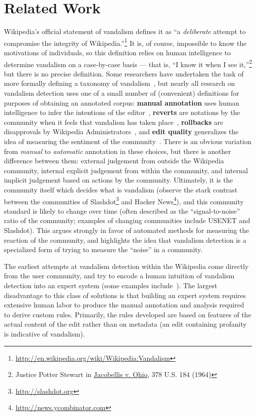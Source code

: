 \section{Related Work}
\label{sec:vandalism-related}

Wikipedia's official statement of vandalism defines it as
``a \textit{deliberate} attempt to compromise the integrity
of Wikipedia.''\footnote{
\url{http://en.wikipedia.org/wiki/Wikipedia:Vandalism}}
It is, of course, impossible to know the motivations of individuals,
so this definition relies on human intelligence to determine
vandalism on a case-by-case basis --- that is, ``I know it
when I see it,''\footnote{Justice Potter Stewart in
\underline{Jacobellis v. Ohio}, 378 U.S. 184 (1964)}
but there is no precise definition.
Some researchers have undertaken the task of more formally defining a
taxonomy of vandalism~\cite{Viegas2004,Priedhorsky2007,Chin2010},
but nearly all research on vandalism detection uses one of a small
number of (convenient) definitions for purposes of obtaining an
annotated corpus: \textbf{manual annotation} uses human intelligence
to infer the intentions of the
editor~\cite{Potthast2008,Chin2010,West2010,Potthast2010a},
\textbf{reverts} are notations by the community when it feels that
vandalism has taken place~\cite{Smets2008,Itakura2009,Belani2010},
\textbf{rollbacks} are disapprovals by Wikipedia
Administrators~\cite{West2010},
and \textbf{edit quality} generalizes the idea of measuring the
sentiment of the community~\cite{Adler2007,Druck2008}.
There is an obvious variation from \textit{manual} to
\textit{automatic} annotation in these choices,
but there is another difference between them:
external judgement from outside the Wikipedia community,
internal explicit judgement from within the community,
and internal implicit judgement based on actions by the community.
Ultimately, it is the community itself which decides what is
vandalism (\eg observe the stark contrast between the communities of
Slashdot\footnote{\url{http://slashdot.org}} and
Hacker News\footnote{\url{http://news.ycombinator.com}}),
and this community standard is likely to change over time
(often described as the ``signal-to-noise'' ratio of the community;
examples of changing communities include USENET and Slashdot).
This argues strongly in favor of automated methods for measuring
the reaction of the community, and highlights the idea that vandalism
detection is a specialized form of trying to measure the ``noise'' in
a community.

The earliest attempts at vandalism detection within the Wikipedia come
directly from the user community, and try to encode a human intuition
of vandalism detection into an expert system (some examples
include~\cite{wiki:AntiVandalBot,wiki:MartinBot,wiki:ClueBot,Carter2007}).
The largest disadvantage to this class of solutions is that building
an expert system requires extensive human labor to produce the manual
annotation and analysis required to derive custom rules.
Primarily, the rules developed are based on features of the actual
content of the edit rather than on metadata (\eg an edit containing
profanity is indicative of vandalism).


